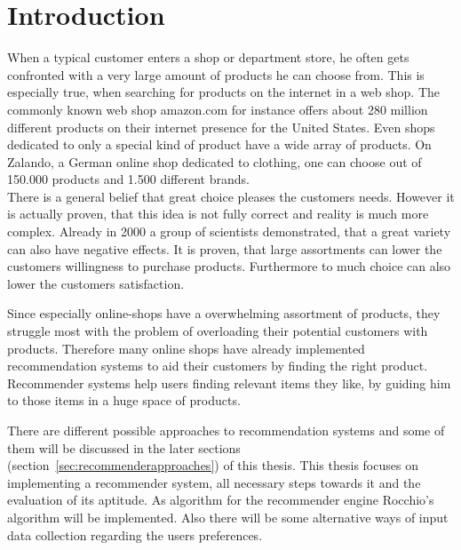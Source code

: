 
\section{Introduction}



When a typical customer enters a shop or department store, he often gets confronted with a very large amount of products he can choose from.
This is especially true, when searching for products on the internet in a web shop.
The commonly known web shop amazon.com for instance offers about 280 million different products on their internet presence for the United States.\citep{marketplaceanalytics:2014}
Even shops dedicated to only a special kind of product have a wide array of products.
On Zalando, a German online shop dedicated to clothing, one can choose out of 150.000 products and 1.500 different brands.\citep{visser:2014}\\
There is a general belief that great choice pleases the customers needs.
However it is actually proven, that this idea is not fully correct and reality is much more complex.
Already in 2000 a group of scientists demonstrated, that a great variety can also have negative effects.\citep[312]{diehl:2010}
It is proven, that large assortments can lower the customers willingness to purchase products.\citep[313]{diehl:2010}
Furthermore to much choice can also lower the customers satisfaction.\citep[320]{diehl:2010}


Since especially online-shops have a overwhelming assortment of products, they struggle most with the problem of overloading their potential customers with products.
Therefore many online shops have already implemented recommendation systems to aid their customers by finding the right product.
Recommender systems help users finding relevant items they like, by guiding him to those items in a huge space of products.\citep[p.~63]{bollen:2010}


There are different possible approaches to recommendation systems and some of them will be discussed in the later sections (section~\ref{sec:recommenderapproaches}) of this thesis.
This thesis focuses on implementing a recommender system, all necessary steps towards it and the evaluation of its aptitude.
As algorithm for the recommender engine Rocchio's algorithm will be implemented.
Also there will be some alternative ways of input data collection regarding the users preferences.



